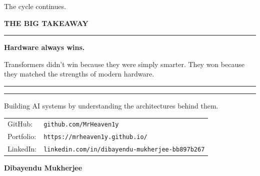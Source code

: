 \documentclass[11pt]{article}
\begin{document}
The cycle continues.

\newpage

\vspace*{0.3in}
\begin{center}
    
    {\fontsize{14}{16}\selectfont\color{brandblue}\textbf{THE BIG TAKEAWAY}}
    
    \vspace{0.8in}
    
    \begin{minipage}{0.85\textwidth}
        \centering
        {\color{brandblue}\rule{6cm}{1pt}}
        \vspace{0.3in}
        
        {\fontsize{24}{30}\selectfont\color{brandnavy}\bfseries
        Hardware always wins.\\[0.1in]}
        
        \vspace{0.15in}
        
        {\fontsize{18}{24}\selectfont\color{brandgray}
        Transformers didn't win because they were simply smarter.
        They won because they matched the strengths of modern hardware.
        }
        
        \vspace{0.3in}
        {\color{brandblue}\rule{6cm}{1pt}}
    \end{minipage}
    
\end{center}
\vfill

\begin{center}
    \rule{0.6\textwidth}{0.5pt}

    \vspace{0.18in}
    
{\fontsize{11}{13}\selectfont\color{brandgray}
Building AI systems by understanding the architectures behind them.
}

    \vspace{0.18in}

{\fontsize{10}{12}\selectfont\color{brandgray}
\begin{tabular}{@{}l l}
GitHub:   & \texttt{github.com/MrHeaven1y} \\
Portfolio:& \texttt{https://mrheaven1y.github.io/} \\
LinkedIn: & \texttt{linkedin.com/in/dibayendu-mukherjee-bb897b267}
\end{tabular}
}


    \vspace{0.15in}

    {\fontsize{14}{16}\selectfont\color{brandnavy}\textbf{Dibayendu Mukherjee}}

\end{center}

\vspace*{0.3in} 
\end{document}
